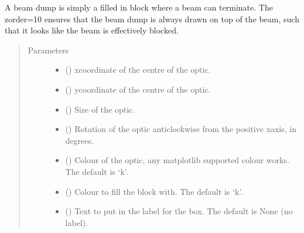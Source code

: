\documentclass[letterpaper,10pt,english]{sphinxmanual}
\begin{document}
\begin{fulllineitems}
\begin{fulllineitems}
\sphinxAtStartPar
A beam dump is simply a filled in block where a beam can terminate.
The zorder=10 ensures that the beam dump is always drawn on top of the beam,
such that it looks like the beam is effectively blocked.
\begin{quote}\begin{description}
\item[{Parameters}] \leavevmode\begin{itemize}
\item {} 
\sphinxAtStartPar
{} () \textendash{} x\sphinxhyphen{}coordinate of the centre of the optic.

\item {} 
\sphinxAtStartPar
{} () \textendash{} y\sphinxhyphen{}coordinate of the centre of the optic.

\item {} 
\sphinxAtStartPar
{} () \textendash{} Size of the optic.

\item {} 
\sphinxAtStartPar
{} () \textendash{} Rotation of the optic anticlockwise from the positive x\sphinxhyphen{}axis, in degrees.

\item {} 
\sphinxAtStartPar
{} (\sphinxstyleliteralemphasis{\sphinxupquote{, }}) \textendash{} Colour of the optic, any matplotlib supported colour works. The default is ‘k’.

\item {} 
\sphinxAtStartPar
{} (\sphinxstyleliteralemphasis{\sphinxupquote{, }}) \textendash{} Colour to fill the block with. The default is ‘k’.

\item {} 
\sphinxAtStartPar
{} (\sphinxstyleliteralemphasis{\sphinxupquote{, }}) \textendash{} Text to put in the label for the box. The default is None (no label).


\end{itemize}
\end{description}
\end{quote}
\end{fulllineitems}
\end{fulllineitems}
\end{document}
